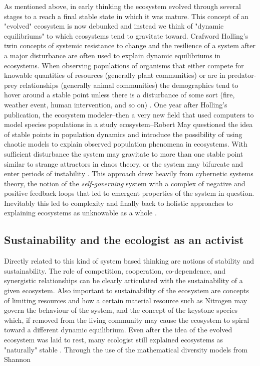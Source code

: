 As mentioned above, in early thinking the ecosystem evolved through several stages to a reach a final stable state in which it was mature. This concept of an "evolved" ecosystem is now debunked and instead we think of "dynamic equilibriums" to which ecosystems tend to gravitate toward. Crafword Holling's twin concepts of systemic resistance to change and the resilience of a system after a major disturbance are often used to explain dynamic equilibriums in ecosystems. When observing populations of organisms that either compete for knowable quantities of resources (generally plant communities) or are in predator-prey relationships (generally animal communities) the demographics tend to hover around a stable point unless there is a disturbance of some sort (fire, weather event, human intervention, and so on) \cite{holling_1973}. One year after Holling's publication, the ecosystem modeler--then a very new field that used computers to model species populations in a study ecosystem--Robert May questioned the idea of stable points in population dynamics and introduce the possibility of using chaotic models to explain observed population phenomena in ecosystems. With sufficient disturbance the system may gravitate to more than one stable point similar to strange attractors in chaos theory, or the system may bifurcate and enter periods of instability \cite{may_1974}. This approach drew heavily from cybernetic systems theory, the notion of the \textit{self-governing} system with a complex of negative and positive feedback loops that led to emergent properties of the system in question. Inevitably this led to complexity and finally back to holistic approaches to explaining ecosystems as unknowable as a whole \cite{barbour_1996}.

\subsection{Sustainability and the ecologist as an activist}
Directly related to this kind of system based thinking are notions of stability and sustainability. The role of competition, cooperation, co-dependence, and synergistic relationships can be clearly articulated with the sustainability of a given ecosystem. Also important to sustainability of the ecosystem are concepts of limiting resources and how a certain material resource such as Nitrogen may govern the behaviour of the system, and the concept of the keystone species which, if removed from the living community may cause the ecosystem to spiral toward a different dynamic equilibrium. Even after the idea of the evolved ecosystem was laid to rest, many ecologist still explained ecosystems as "naturally" stable \cite{odum_1953}. Through the use of the mathematical diversity models from Shannon

